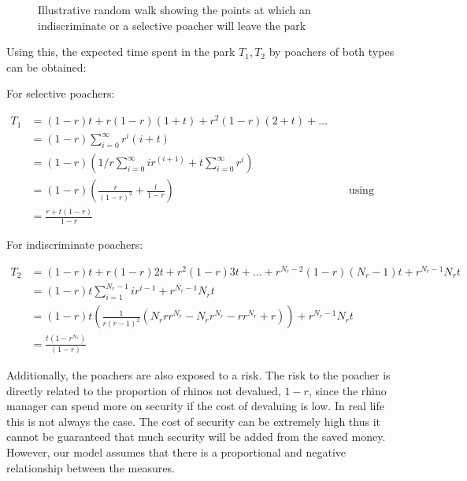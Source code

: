 \documentclass[10pt]{article}
\begin{document}
\begin{figure}[!htbp]
\begin{center}
    \end{center}
    \caption{Illustrative random walk showing the points at which an
    indiscriminate or a selective poacher will leave the park}

    \label{fig:random_walk}
\end{figure}

Using this, the expected time spent in the park \(T_1, T_2\) by poachers of both
types can be obtained:

For selective poachers:

\begin{align}
    T_1 &= (1-r)t + r(1-r)(1+t) + r^2(1-r)(2+t) + \dots\\
        &= (1-r)\sum_{i=0}^{\infty}r^i(i+t)\\
        &= (1-r)\left(1/r\sum_{i=0}^{\infty}ir^{(i+1)} + t\sum_{i=0}^{\infty}r^i\right)\\
        &= (1-r)\left(\frac{r}{(1-r)^2} + \frac{t}{1-r}\right) && \text{ using standard
formulae for geometric series}\\
    &= \frac{r+t(1-r)}{1-r}
\end{align}

For indiscriminate poachers:

\begin{align}
    T_2 &= (1-r)t + r(1-r)2t + r^2(1-r)3t + \dots + r^{N_r - 2}(1-r)(N_r - 1)t + r^{N_r - 1}N_rt\\
        &= (1-r)t\sum_{i=1}^{N_r - 1}ir^{i-1} + r^{N_r - 1}N_rt \\
        &= (1-r)t\left(\frac{1}{r \left(r - 1\right)^{2}} \left(N_{r} r
r^{N_{r}} - N_{r} r^{N_{r}} - r r^{N_{r}} + r\right)\right) + r^{N_r - 1}N_rt \\
        &= \frac{t(1 - r^{N_r})}{(1 - r)}
\end{align}

Additionally, the poachers are also exposed to a risk. The risk to the poacher is
directly related to the proportion of rhinos not devalued, \(1 - r\), since
the rhino manager can spend more on security if the cost of devaluing is low.
In real life this is not always the case. The cost of security can be extremely
high thus it cannot be guaranteed that much security will be added from the
saved money. However, our model assumes that there is a proportional and negative
relationship between the measures.
\end{document}
